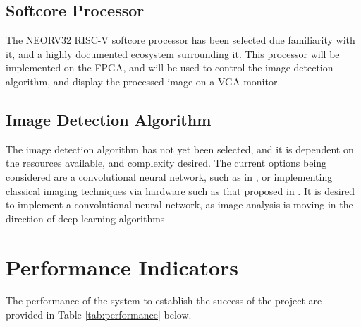\subsection{Softcore Processor}
The NEORV32 RISC-V softcore processor has been selected due familiarity with it, and a highly documented ecosystem surrounding it. 
This processor will be implemented on the FPGA, and will be used to control the image detection algorithm, and display the processed image on a VGA monitor.

\subsection{Image Detection Algorithm}
The image detection algorithm has not yet been selected, and it is dependent on the resources available, and complexity desired.
The current options being considered are a convolutional neural network, such as in \cite{Gradient}, or implementing classical imaging techniques via hardware such as that proposed in \cite{SoCImage}.
It is desired to implement a convolutional neural network, as image analysis is moving in the direction of deep learning algorithms \cite{DCNN}

\section{Performance Indicators}
The performance of the system to establish the success of the project are provided in Table \ref{tab:performance} below.


